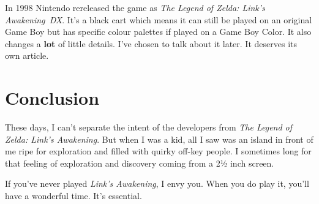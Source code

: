 \documentclass{book}
\begin{document}
In 1998 Nintendo rereleased the game as \emph{The Legend of Zelda: Link’s Awakening~DX}. It’s a black cart which means it can still be played on an original Game Boy but has specific colour palettes if played on a Game Boy Color. It also changes a \textbf{lot} of little details. I’ve chosen to talk about it later. It deserves its own article.\par
\FloatBarrier\section*{Conclusion}
These days, I can’t separate the intent of the developers from \emph{The Legend of Zelda: Link’s Awakening}. But when I was a kid, all I saw was an island in front of me ripe for exploration and filled with quirky off-key people. I sometimes long for that feeling of exploration and discovery coming from a 2½ inch screen.\par
If you’ve never played \emph{Link’s Awakening}, I envy you. When you do play it, you’ll have a wonderful time. It’s essential.\par
\FloatBarrier\vspace{\baselineskip}\begin{figure}[H]\end{figure}
\end{document}
